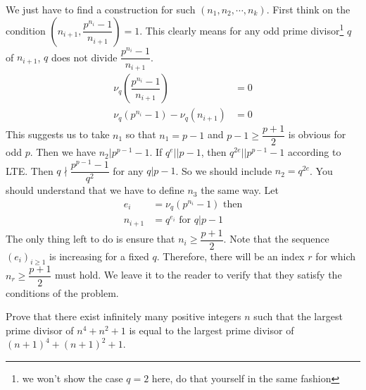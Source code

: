 \documentclass[problems.tex]{subfile}
\begin{document}
\begin{solution}
		We just have to find a construction for such $(n_1,n_2,\cdots,n_k)$. First think on the condition $\left(n_{i+1},\dfrac{p^{n_i}-1}{n_{i+1}}\right)=1$. This clearly means for any odd prime divisor\footnote{we won't show the case $q=2$ here, do that yourself in the same fashion} $q$ of $n_{i+1}$, $q$ does not divide $\dfrac{p^{n_i}-1}{n_{i+1}}$.
			\begin{align*}
				\nu_q\left(\dfrac{p^{n_i}-1}{n_{i+1}}\right) & = 0\\
				\nu_q(p^{n_i}-1)-\nu_q(n_{i+1}) & = 0
			\end{align*}
		This suggests us to take $n_1$ so that $n_1=p-1$ and $p-1\geq\dfrac{p+1}{2}$ is obvious for odd $p$. Then we have $n_2|p^{p-1}-1$. If $q^e||p-1$, then $q^{2e}||p^{p-1}-1$ according to LTE. Then $q\nmid\dfrac{p^{p-1}-1}{q^2}$ for any $q|p-1$. So we should include $n_2=q^{2e}$. You should understand that we have to define $n_3$ the same way. Let
			\begin{align*}
				e_i & = \nu_q\left(p^{n_i}-1\right)\text { then}\\
				n_{i+1} & = q^{e_i}\text { for }q|p-1
			\end{align*}
		The only thing left to do is ensure that $n_i\geq\dfrac{p+1}{2}$. Note that the sequence $(e_i)_{i\geq1}$ is increasing for a fixed $q$. Therefore, there will be an index $r$ for which $n_r\geq\dfrac{p+1}{2}$ must hold. We leave it to the reader to verify that they satisfy the conditions of the problem.
	\end{solution}
	
	\begin{problem}
		Prove that there exist infinitely many positive integers $n$ such that the largest prime divisor of $n^4+n^2+1$ is equal to the largest prime divisor of $(n+1)^4+(n+1)^2+1$.
	\end{problem}
	
\end{document}
